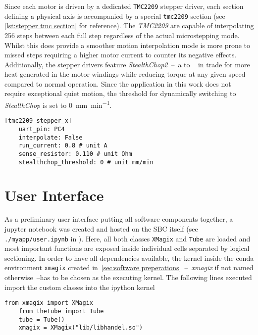         Since each motor is driven by a dedicated \texttt{TMC2209} stepper driver, each section defining a physical axis is accompanied by a special \texttt{tmc2209} section (see \cref{lst:stepper tmc section} for reference).
        The \textit{TMC2209} are capable of interpolating 256 steps between each full step regardless of the actual microstepping mode.
        Whilst this does provide a smoother motion interpolation mode is more prone to missed steps requiring a higher motor current to counter its negative effects.
        Additionally, the stepper drivers feature \textit{StealthChop2}~--~a  to ~\cite{Manual.TMC2209Datasheet} in trade for more heat generated in the motor windings while reducing torque at any given speed compared to normal operation.
        Since the application in this work does not require exceptional quiet motion, the threshold for dynamically switching to \textit{StealthChop} is set to \qty{0}{\milli\metre\per\minute}.
        \begin{lstlisting}[style=mydjango, firstnumber=31,
            caption={[Stepper corresponding stepper driver section of \texttt{printer.cfg}]Stepper corresponding stepper driver section of \texttt{printer.cfg}.},
            label={lst:stepper tmc section}%
            ]
    [tmc2209 stepper_x]
    uart_pin: PC4
    interpolate: False
    run_current: 0.8 # unit A
    sense_resistor: 0.110 # unit Ohm
    stealthchop_threshold: 0 # unit mm/min
        \end{lstlisting}

    \section{User Interface}
        As a preliminary user interface putting all software components together, a jupyter notebook was created and hosted on the SBC itself (see \texttt{./myapp/user.ipynb} in \cite{Software.XraythesisHandel.2023}).
        Here, all both classes \texttt{XMagix} and \texttt{Tube} are loaded and most important functions are exposed inside individual cells separated by logical sectioning.
        In order to have all dependencies available, the kernel inside the conda environment \texttt{xmagix} created in~\cref{sec:software preperations}~--~\textit{xmagix} if not named otherwise~--has to be chosen as the executing kernel.
        The following lines executed import the custom classes into the ipython kernel
        \begin{lstlisting}[style=mypython, firstnumber=auto]
    from xmagix import XMagix
    from thetube import Tube
    tube = Tube()
    xmagix = XMagix("lib/libhandel.so")
        \end{lstlisting}
